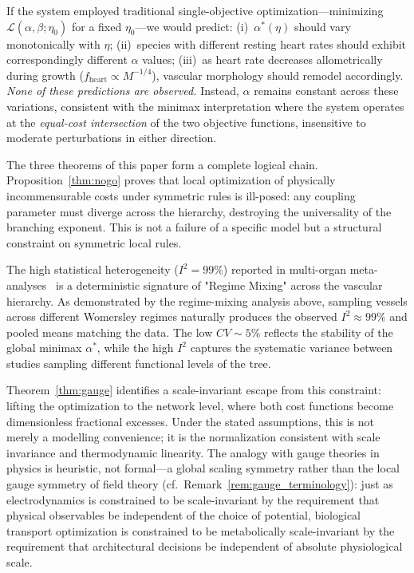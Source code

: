 If the system employed traditional single-objective optimization---minimizing
$\mathcal{L}(\alpha, \beta; \eta_0)$ for a fixed $\eta_0$---we would predict:
(i)~$\alpha^*(\eta)$ should vary monotonically with $\eta$; (ii)~species with
different resting heart rates should exhibit correspondingly different $\alpha$
values; (iii)~as heart rate decreases allometrically during growth
($f_\mathrm{heart} \propto M^{-1/4}$), vascular morphology should remodel
accordingly. \emph{None of these predictions are observed.} Instead, $\alpha$
remains constant across these variations, consistent with the minimax
interpretation where the system operates at the \emph{equal-cost intersection}
of the two objective functions, insensitive to moderate perturbations in either
direction.

The three theorems of this paper form a complete logical chain.
Proposition~\ref{thm:nogo} proves that local optimization of physically
incommensurable costs under symmetric rules is ill-posed: any coupling parameter
must diverge across the hierarchy, destroying the universality of the branching
exponent. This is not a failure of a specific model but a structural constraint
on symmetric local rules.

\begin{remark}
The high statistical heterogeneity ($I^2 = 99\%$) reported in multi-organ
meta-analyses~\cite{taylor2024} is a deterministic signature of "Regime Mixing"
across the vascular hierarchy. As demonstrated by the regime-mixing analysis
above, sampling vessels across different Womersley regimes naturally produces
the observed $I^2 \approx 99\%$ and pooled means matching the data. The low $CV
\sim 5\%$ reflects the stability of the global minimax $\alpha^*$, while the
high $I^2$ captures the systematic variance between studies sampling different
functional levels of the tree.
\end{remark}

Theorem~\ref{thm:gauge} identifies a scale-invariant escape from this
constraint: lifting the optimization to the network level, where both cost
functions become dimensionless fractional excesses. Under the stated
assumptions, this is not merely a modelling convenience; it is the
normalization consistent with scale invariance and thermodynamic
linearity. The analogy with gauge theories in physics is heuristic, not
formal---a global scaling symmetry rather than the local gauge symmetry of field
theory (cf.\ Remark~\ref{rem:gauge_terminology}): just as electrodynamics is
constrained to be scale-invariant by the requirement that physical
observables be independent of the choice of potential, biological transport
optimization is constrained to be metabolically scale-invariant by the
requirement that architectural decisions be independent of absolute
physiological scale.


